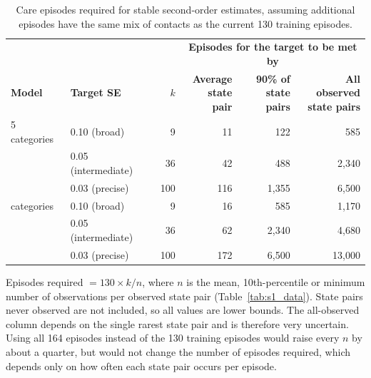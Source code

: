\begin{table}[htbp]
\centering
\small
\caption{Care episodes required for stable second-order estimates, assuming additional episodes have the same mix of contacts as the current 130 training episodes.}
\label{tab:s1_episodes}
\setlength{\tabcolsep}{4pt}
\begin{tabular*}{\linewidth}{@{\extracolsep{\fill}}llrrrr}
\toprule
 & & & \multicolumn{3}{c}{\textbf{Episodes for the target to be met by}} \\
\cmidrule(lr){4-6}
\textbf{Model} & \textbf{Target SE} & $k$ & \shortstack{\textbf{Average}\\\textbf{state pair}} & \shortstack{\textbf{90\% of}\\\textbf{state pairs}} & \shortstack{\textbf{All observed}\\\textbf{state pairs}} \\
\midrule
5 categories & 0.10 (broad) & 9 & 11 & 122 & 585 \\
 & 0.05 (intermediate) & 36 & 42 & 488 & 2,340 \\
 & 0.03 (precise) & 100 & 116 & 1,355 & 6,500 \\
\addlinespace
7 categories & 0.10 (broad) & 9 & 16 & 585 & 1,170 \\
 & 0.05 (intermediate) & 36 & 62 & 2,340 & 4,680 \\
 & 0.03 (precise) & 100 & 172 & 6,500 & 13,000 \\
\bottomrule
\end{tabular*}
\par\smallskip
\begin{minipage}{\linewidth}\footnotesize
Episodes required $= 130 \times k / n$, where $n$ is the mean, 10th-percentile or minimum number of observations per observed state pair (Table~\ref{tab:s1_data}). State pairs never observed are not included, so all values are lower bounds. The all-observed column depends on the single rarest state pair and is therefore very uncertain. Using all 164 episodes instead of the 130 training episodes would raise every $n$ by about a quarter, but would not change the number of episodes required, which depends only on how often each state pair occurs per episode.
\end{minipage}
\end{table}
